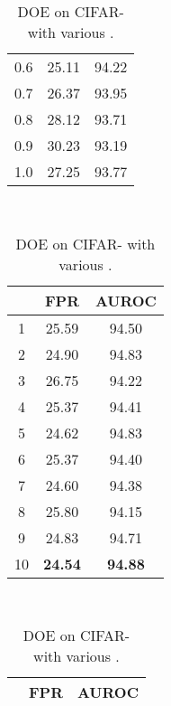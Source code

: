 \documentclass{article} \usepackage{iclr2022_conference,times}
\begin{document}
\begin{table}[t]
{{\begin{tabular}{c|cc}
0.6               & 25.11                  & 94.22                  \\
0.7               & 26.37                  & 93.95                  \\
0.8               & 28.12                  & 93.71                  \\
0.9               & 30.23                  & 93.19                  \\
1.0               & 27.25                  & 93.77                  \\
\bottomrule[1.5pt]      
\end{tabular}
}}~~
\parbox{.23\linewidth}{
\centering
\scriptsize
\caption{DOE on CIFAR- with various .} \label{tab: hyper_pert}
\vspace{5pt}
{
\begin{tabular}{c|cc}
\toprule[1.5pt]
                   & FPR                & AUROC               \\
\midrule[0.6pt]
1               & 25.59                  & 94.50                  \\
2               & 24.90                  & 94.83                  \\
3               & 26.75                  & 94.22                  \\
4               & 25.37                  & 94.41                  \\
5               & 24.62                  & 94.83                  \\
6               & 25.37                  & 94.40                  \\
7               & 24.60                  & 94.38                  \\
8               & 25.80                  & 94.15                  \\
9               & 24.83                  & 94.71                  \\
\cellcolor{greyL}10              & \cellcolor{greyL}\textbf{24.54}                  & \cellcolor{greyL}\textbf{94.88}                  \\
\bottomrule[1.5pt]      
\end{tabular}
}}~~
\parbox{.23\linewidth}{
\centering
\scriptsize
\caption{DOE on CIFAR- with various .} \label{tab: hyper_warm}
\vspace{5pt}
{
\begin{tabular}{c|cc}
\toprule[1.5pt]
                   & FPR                & AUROC               \\
\midrule[0.6pt]

\end{tabular}}}
\end{table}
\end{document}
